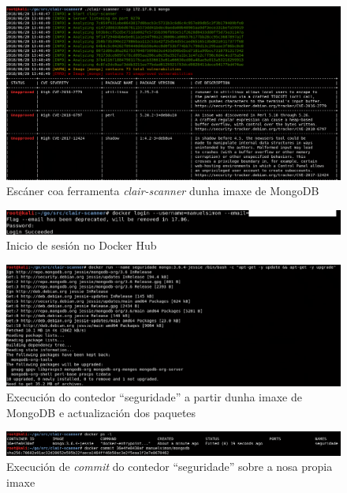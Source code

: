 \begin{figure}
\centerline{\includegraphics[width=15cm]{figuras/rep1.png}}
\caption{Escáner coa ferramenta \textit{clair-scanner} dunha imaxe de MongoDB}
\label{rep1}
\end{figure}

\begin{figure}
\centerline{\includegraphics[width=15cm]{figuras/rep3.png}}
\caption{Inicio de sesión no Docker Hub}
\label{rep3}
\end{figure}

\begin{figure}
\centerline{\includegraphics[width=15cm]{figuras/rep4.png}}
\caption{Execución do contedor ``seguridade'' a partir dunha imaxe de MongoDB e actualización dos paquetes}
\label{rep4}
\end{figure}

\begin{figure}
\centerline{\includegraphics[width=15cm]{figuras/rep5.png}}
\caption{Execución de \textit{commit} do contedor ``seguridade'' sobre a nosa propia imaxe}
\label{rep5}
\end{figure}

